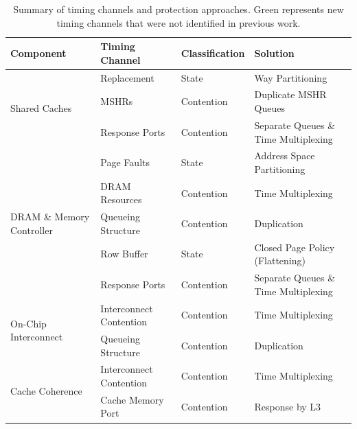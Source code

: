 \def\novelcolor{Green}
\begin{table}
\begin{center}
\begin{small}
\begin{tabular}{l|l|l|l}
    \hline
    Component & Timing Channel & Classification & Solution\\
    \hline
    \multirow{3}{*}{Shared Caches}
    & Replacement & State  & Way Partitioning \\
    \hhline{~---}
    & {\color{\novelcolor}MSHRs}
    & {\color{\novelcolor}Contention }
    & {\color{\novelcolor}Duplicate MSHR Queues} \\
    \hhline{~---}
    & {\color{\novelcolor}Response Ports}
    & {\color{\novelcolor}Contention }
    & {\color{\novelcolor}Separate Queues \& Time Multiplexing}\\
    \hline
    \multirow{5}{*}{DRAM \& Memory Controller}
    & Page Faults & State  & Address Space Partitioning \\
    \hhline{~---}
    & DRAM Resources & Contention  & Time Multiplexing \\
    \hhline{~---}
    & Queueing Structure & Contention & Duplication \\
    \hhline{~---}
    & Row Buffer & State & Closed Page Policy (Flattening)\\
    \hhline{~---}
    & {\color{\novelcolor} Response Ports} & {\color{\novelcolor} Contention }
    & {\color{\novelcolor} Separate Queues \& Time Multiplexing}\\
    \hline
    \multirow{2}{*}{On-Chip Interconnect} & Interconnect Contention & Contention & Time 
    Multiplexing \\
    \hhline{~---}
    & Queueing Structure & Contention & Duplication \\
    \hline
    \multirow{2}{*}{{\color{\novelcolor} Cache Coherence}} & {\color{\novelcolor} Interconnect Contention} & {\color{\novelcolor} Contention} & {\color{\novelcolor} Time 
    Multiplexing} \\
    \hhline{~---}
    & {\color{\novelcolor} Cache Memory Port} & {\color{\novelcolor} Contention} & {\color{\novelcolor} Response by L3}\\
    \hline
\end{tabular}
\end{small}
\end{center}
    \caption{Summary of timing channels and protection approaches. Green 
    represents new timing channels that were not identified in previous work.}
    \label{table:timing_chan_summary}
\end{table}

